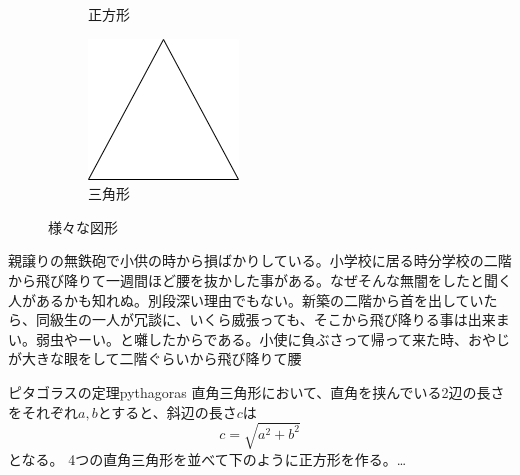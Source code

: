 \begin{figure}[H]
\begin{subfigure}[b]{0.2\textwidth}
        \caption{正方形}
        \label{fig:square}
    \end{subfigure}
    \hfill
    \begin{subfigure}[b]{0.2\textwidth}
        \centering\includegraphics[width=\textwidth]{figures/triangle.drawio.png}
        \caption{三角形}
        \label{fig:triangle}
    \end{subfigure}
    \caption{様々な図形}
    \label{fig:shapes}
\end{figure}

親譲りの無鉄砲で小供の時から損ばかりしている。小学校に居る時分学校の二階から飛び降りて一週間ほど腰を抜かした事がある。なぜそんな無闇をしたと聞く人があるかも知れぬ。別段深い理由でもない。新築の二階から首を出していたら、同級生の一人が冗談に、いくら威張っても、そこから飛び降りる事は出来まい。弱虫やーい。と囃したからである。小使に負ぶさって帰って来た時、おやじが大きな眼をして二階ぐらいから飛び降りて腰

\begin{theorem}{ピタゴラスの定理}{pythagoras}
    直角三角形において、直角を挟んでいる2辺の長さをそれぞれ\(a, b\)とすると、斜辺の長さ\(c\)は
    \begin{equation}
        c = \sqrt{a^2 + b^2}
    \end{equation}
    となる。
    \tcblower
    4つの直角三角形を並べて下のように正方形を作る。…
\end{theorem}

